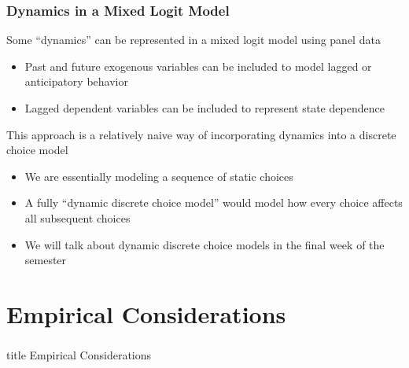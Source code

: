 \documentclass{beamer}\usepackage[]{graphicx}\usepackage[]{color}
\begin{document}
\begin{frame}\frametitle{Dynamics in a Mixed Logit Model}
    Some ``dynamics'' can be represented in a mixed logit model using panel data
    \begin{itemize}
        \item Past and future exogenous variables can be included to model lagged or anticipatory behavior
        \item Lagged dependent variables can be included to represent state dependence 
    \end{itemize}
    \vspace{3ex}
    This approach is a relatively naive way of incorporating dynamics into a discrete choice model
    \begin{itemize}
        \item We are essentially modeling a sequence of static choices
        \item A fully ``dynamic discrete choice model'' would model how every choice affects all subsequent choices
        \item We will talk about dynamic discrete choice models in the final week of the semester
    \end{itemize}
\end{frame}

\section{Empirical Considerations}
\label{empirical}
\begin{frame}\frametitle{}
    \vfill
    \centering 
    \begin{beamercolorbox}[center]{title}
        \Large Empirical Considerations
    \end{beamercolorbox}
    \vfill
\end{frame}
\end{document}
